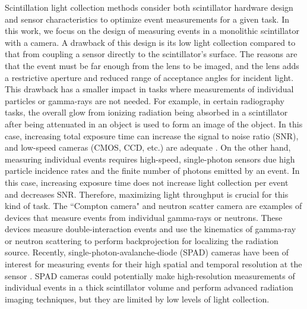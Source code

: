 Scintillation light collection methods consider both scintillator hardware design  
and sensor characteristics to optimize event measurements for a given task.
In this work, we focus on the design of measuring events in a monolithic 
scintillator with a camera.
A drawback of this design is its low light collection compared to that from 
coupling a sensor directly to the scintillator's surface.
The reasons are that the event must be far enough from the lens to be imaged, and 
the lens adds a restrictive aperture and reduced range of acceptance angles for 
incident light.
This drawback has a smaller impact in tasks where measurements of individual 
particles or gamma-rays are not needed.
For example, in certain radiography tasks, the overall glow from ionizing 
radiation being absorbed in a scintillator after being attenuated in an object is 
used to form an image of the object.
In this case, increasing total exposure time can increase the signal to 
noise ratio (SNR), and low-speed cameras (CMOS, CCD, etc.) are adequate \cite{pleinert1997design,baker2014scintillator,adams2017gamma,balasubramanian2022x,gustschin2024event}.
On the other hand, measuring individual events requires high-speed, single-photon 
sensors due high particle incidence rates and the finite number of photons emitted 
by an event.
In this case, increasing exposure time does not increase light collection per 
event and decreases SNR.
Therefore, maximizing light throughput is crucial for this kind of task.
The ``Compton camera" \cite{kataoka2013handy, hosokoshi2019development, llosa2019sipm, parajuli2022development, kim2024comprehensive} 
and neutron scatter camera \cite{mascarenhas2006development,marleau2007advances,mascarenhas2009results,weinfurther2018model} 
are examples of devices that measure events from individual gamma-rays or neutrons.
These devices measure double-interaction events and use the kinematics of 
gamma-ray or neutron scattering to perform backprojection for localizing the 
radiation source. %
Recently, single-photon-avalanche-diode (SPAD) cameras have been of interest for 
measuring events for their high spatial and temporal resolution at the sensor \cite{bocchieri2024scintillation}.
SPAD cameras could potentially make high-resolution measurements of individual 
events in a thick scintillator volume and perform advanced radiation imaging 
techniques, but they are limited by low levels of light collection.

